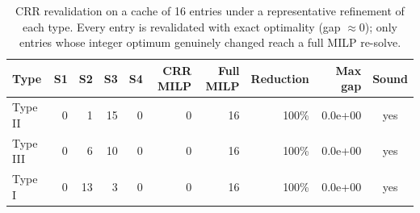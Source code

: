 \begin{table}[t]
\centering
\caption{CRR revalidation on a cache of 16 entries under a representative refinement of each type. Every entry is revalidated with exact optimality (gap $\approx 0$); only entries whose integer optimum genuinely changed reach a full MILP re-solve.}
\label{tab:crr-efficiency}
\small
\begin{tabular}{lrrrrrrrrc}
\toprule
Type & S1 & S2 & S3 & S4 & CRR MILP & Full MILP & Reduction & Max gap & Sound \\
\midrule
Type II & 0 & 1 & 15 & 0 & 0 & 16 & 100\% & 0.0e+00 & yes \\
Type III & 0 & 6 & 10 & 0 & 0 & 16 & 100\% & 0.0e+00 & yes \\
Type I & 0 & 13 & 3 & 0 & 0 & 16 & 100\% & 0.0e+00 & yes \\
\bottomrule
\end{tabular}
\end{table}
